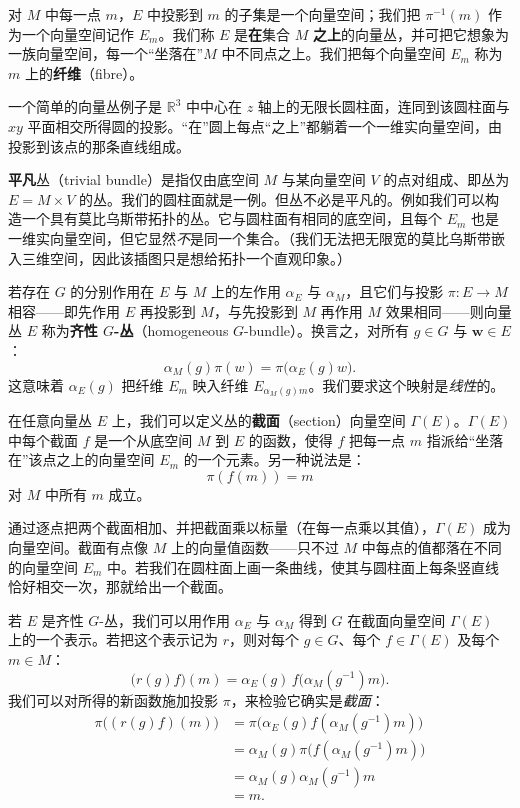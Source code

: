 对 $M$ 中每一点 $m$，$E$ 中投影到 $m$ 的子集是一个向量空间；我们把 $\pi^{-1}(m)$ 作为一个向量空间记作 $E_m$。我们称 $E$ 是\textbf{在}集合 $M$ \textbf{之上}的向量丛，并可把它想象为一族向量空间，每一个“坐落在”$M$ 中不同点之上。我们把每个向量空间 $E_m$ 称为 $m$ 上的\textbf{纤维}（fibre）。

一个简单的向量丛例子是 $\mathbb{R}^3$ 中中心在 $z$ 轴上的无限长圆柱面，连同到该圆柱面与 $xy$ 平面相交所得圆的投影。“在”圆上每点“之上”都躺着一个一维实向量空间，由投影到该点的那条直线组成。

\textbf{平凡}丛（trivial bundle）是指仅由底空间 $M$ 与某向量空间 $V$ 的点对组成、即丛为 $E=M\times V$ 的丛。我们的圆柱面就是一例。但丛不必是平凡的。例如我们可以构造一个具有莫比乌斯带拓扑的丛。它与圆柱面有相同的底空间，且每个 $E_m$ 也是一维实向量空间，但它显然\emph{不}是同一个集合。（我们无法把无限宽的莫比乌斯带嵌入三维空间，因此该插图只是想给拓扑一个直观印象。）

若存在 $G$ 的分别作用在 $E$ 与 $M$ 上的左作用 $\alpha_E$ 与 $\alpha_M$，且它们与投影 $\pi:E\to M$ 相容——即先作用 $E$ 再投影到 $M$，与先投影到 $M$ 再作用 $M$ 效果相同——则向量丛 $E$ 称为\textbf{齐性 $G$-丛}（homogeneous $G$-bundle）。换言之，对所有 $g\in G$ 与 $\mathbf{w}\in E$：
\[
\alpha_M(g)\pi(w)=\pi\big(\alpha_E(g)w\big).
\]
这意味着 $\alpha_E(g)$ 把纤维 $E_m$ 映入纤维 $E_{\alpha_M(g)m}$。我们要求这个映射是\emph{线性}的。

在任意向量丛 $E$ 上，我们可以定义丛的\textbf{截面}（section）向量空间 $\Gamma(E)$。$\Gamma(E)$ 中每个截面 $f$ 是一个从底空间 $M$ 到 $E$ 的函数，使得 $f$ 把每一点 $m$ 指派给“坐落在”该点之上的向量空间 $E_m$ 的一个元素。另一种说法是：
\[
\pi(f(m))=m
\]
对 $M$ 中所有 $m$ 成立。

通过逐点把两个截面相加、并把截面乘以标量（在每一点乘以其值），$\Gamma(E)$ 成为向量空间。截面有点像 $M$ 上的向量值函数——只不过 $M$ 中每点的值都落在不同的向量空间 $E_m$ 中。若我们在圆柱面上画一条曲线，使其与圆柱面上每条竖直线恰好相交一次，那就给出一个截面。

若 $E$ 是齐性 $G$-丛，我们可以用作用 $\alpha_E$ 与 $\alpha_M$ 得到 $G$ 在截面向量空间 $\Gamma(E)$ 上的一个表示。若把这个表示记为 $r$，则对每个 $g\in G$、每个 $f\in\Gamma(E)$ 及每个 $m\in M$：
\begin{equation}
\big(r(g)f\big)(m)=\alpha_E(g)\,f\big(\alpha_M(g^{-1})m\big). \tag{4.2.5}
\end{equation}
我们可以对所得的新函数施加投影 $\pi$，来检验它确实是\emph{截面}：
\begin{align*}
\pi\big((r(g)f)(m)\big)
&=\pi\big(\alpha_E(g)f(\alpha_M(g^{-1})m)\big)\\
&=\alpha_M(g)\pi\big(f(\alpha_M(g^{-1})m)\big)\\
&=\alpha_M(g)\alpha_M(g^{-1})m\\
&=m .
\end{align*}


